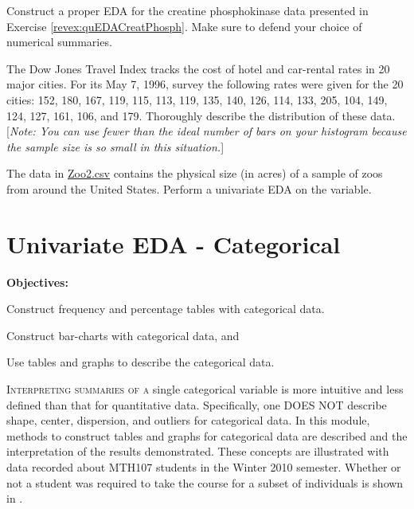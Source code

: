 \documentclass[10pt,openany]{book}\usepackage[]{graphicx}\usepackage[]{color}
\begin{document}
\newpage
\begin{exsection}
  \item \label{revex:quEDACP} \rhw{} Construct a proper EDA for the creatine phosphokinase data presented in Exercise \ref{revex:quEDACreatPhosph}.  Make sure to defend your choice of numerical summaries.  
  \item \label{revex:quEDADJTI} \rhw{} \hspace{12pt} The Dow Jones Travel Index tracks the cost of hotel and car-rental rates in 20 major cities.  For its May 7, 1996, survey the following rates were given for the 20 cities: 152, 180, 167, 119, 115, 113, 119, 135, 140, 126, 114, 133, 205, 104, 149, 124, 127, 161, 106, and 179.  Thoroughly describe the distribution of these data.  [\textit{Note: You can use fewer than the ideal number of bars on your histogram because the sample size is so small in this situation.}] 
  \item \label{revex:quEDAZoo2} \rhw{} The data in \href{https://raw.githubusercontent.com/droglenc/NCData/master/Zoo2.csv}{Zoo2.csv} contains the physical size (in acres) of a sample of zoos from around the United States.  Perform a univariate EDA on the  variable. 
\end{exsection}



\chapter{Univariate EDA - Categorical} \label{chap:UnivEDACat}
\begin{ChapObj}{\boxwidth}
  \textbf{Objectives:}
  \begin{Enumerate}
    \item Construct frequency and percentage tables with categorical data.
    \item Construct bar-charts with categorical data, and
    \item Use tables and graphs to describe the categorical data.
  \end{Enumerate}
\end{ChapObj}

\minitoc
\vspace{24pt}

\lettrine{I}{nterpreting summaries of a} single categorical variable is more intuitive and less defined than that for quantitative data.  Specifically, one DOES NOT describe shape, center, dispersion, and outliers for categorical data.  In this module, methods to construct tables and graphs for categorical data are described and the interpretation of the results demonstrated.  These concepts are illustrated with data recorded about MTH107 students in the Winter 2010 semester.  Whether or not a student was required to take the course for a subset of individuals is shown in .
\end{document}
